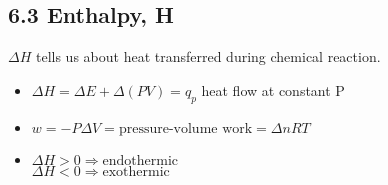 \subsection{6.3 Enthalpy, H}
    $\Delta H$ tells us about heat transferred during chemical reaction.
    \begin{itemize}
        \itemsep0em
        \item $\Delta H = \Delta E + \Delta(PV) = q_p$ heat flow at constant P
        \item $w = -P \Delta V = \text{pressure-volume work} = \Delta n R T$
        \item $\Delta H > 0 \Rightarrow \text{endothermic}$\\
              $\Delta H < 0 \Rightarrow \text{exothermic}$
    \end{itemize}